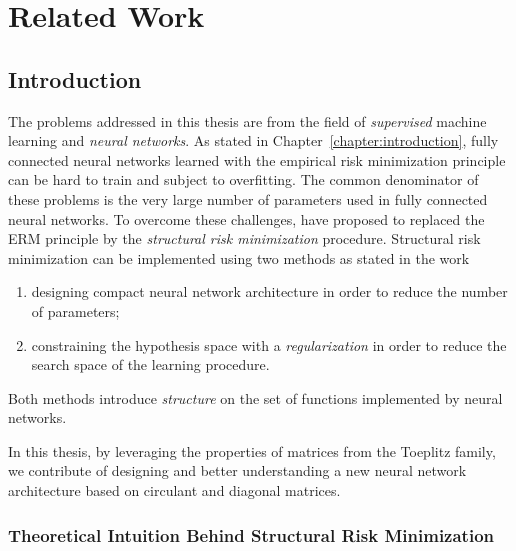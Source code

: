 
\chapter{Related Work}
\label{chapter:related_work}
\localtableofcontents


\section{Introduction}
\label{section:ch2-introduction}

The problems addressed in this thesis are from the field of \emph{supervised} machine learning and \emph{neural networks}.  
As stated in Chapter~\ref{chapter:introduction}, fully connected neural networks learned with the empirical risk minimization principle can be hard to train and subject to overfitting.
The common denominator of these problems is the very large number of parameters used in fully connected neural networks.  
To overcome these challenges, \citet{vapnik1992principles} have proposed to replaced the ERM principle by the \emph{structural risk minimization} procedure.
Structural risk minimization can be implemented using two methods as stated in the work 
\begin{enumerate}
  \item designing compact neural network architecture in order to reduce the number of parameters;
  \item constraining the hypothesis space with a \emph{regularization} in order to reduce the search space of the learning procedure.
\end{enumerate}
Both methods introduce \emph{structure} on the set of functions implemented by neural networks. 

In this thesis, by leveraging the properties of matrices from the Toeplitz family, we contribute of designing and better understanding a new neural network architecture based on circulant and diagonal matrices. 


\subsection{Theoretical Intuition Behind Structural Risk Minimization}
\label{subsection:ch2-xxx}

